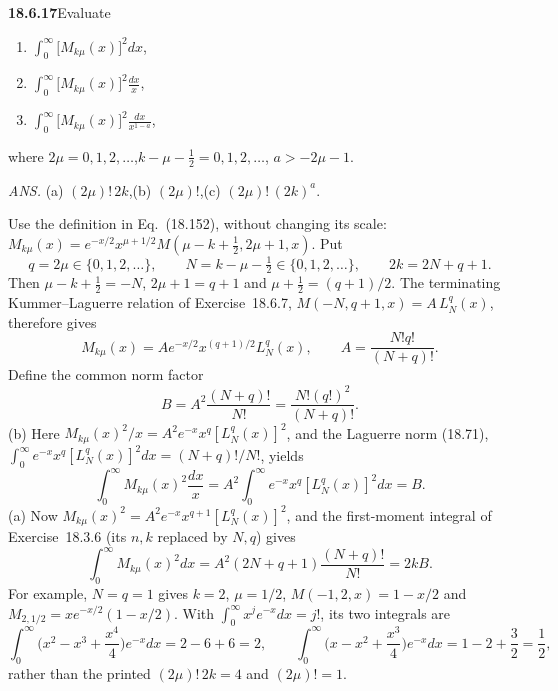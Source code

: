 \par\bigskip
\noindent\textbf{18.6.17}\quad Evaluate
\begin{enumerate}
\item[(a)] $\displaystyle\int_{0}^{\infty}
\big[M_{k\mu}(x)\big]^{2}dx$,
\item[(b)] $\displaystyle\int_{0}^{\infty}
\big[M_{k\mu}(x)\big]^{2}\frac{dx}{x}$,
\item[(c)] $\displaystyle\int_{0}^{\infty}
\big[M_{k\mu}(x)\big]^{2}\frac{dx}{x^{1-a}}$,
\end{enumerate}
where $2\mu=0,1,2,\ldots$,\quad $k-\mu-\tfrac{1}{2}=0,1,2,\ldots$,
\quad $a>-2\mu-1$.
\par\nobreak\hfill\emph{ANS.}\enspace
(a) $(2\mu)!\,2k$,\quad (b) $(2\mu)!$,\quad (c) $(2\mu)!\,(2k)^{a}$.
\par{}\par\nobreak
\solution
Use the definition in Eq.~(18.152), without changing its scale:
$M_{k\mu}(x)=e^{-x/2}x^{\mu+1/2}M(\mu-k+\tfrac12,2\mu+1,x)$.
Put
\[
q=2\mu\in\{0,1,2,\ldots\},\qquad
N=k-\mu-\tfrac12\in\{0,1,2,\ldots\},\qquad
2k=2N+q+1.
\]
Then $\mu-k+\tfrac12=-N$, $2\mu+1=q+1$ and $\mu+\tfrac12=(q+1)/2$.
The terminating Kummer--Laguerre relation of Exercise~18.6.7,
$M(-N,q+1,x)=A\,L_N^q(x)$, therefore gives
\[
M_{k\mu}(x)=A e^{-x/2}x^{(q+1)/2}L_N^q(x),\qquad
 A=\frac{N!q!}{(N+q)!}.
\]
Define the common norm factor
\[
B=A^2\frac{(N+q)!}{N!}
 =\boxed{\frac{N!(q!)^2}{(N+q)!}}.
\]
(b) Here $M_{k\mu}(x)^2/x=A^2e^{-x}x^q[L_N^q(x)]^2$, and the
Laguerre norm (18.71),
$\int_0^\infty e^{-x}x^q[L_N^q(x)]^2dx=(N+q)!/N!$, yields
\[
\int_0^\infty M_{k\mu}(x)^2\frac{dx}x
 =A^2\int_0^\infty e^{-x}x^q[L_N^q(x)]^2dx
 =\boxed{B}.
\]
(a) Now $M_{k\mu}(x)^2=A^2e^{-x}x^{q+1}[L_N^q(x)]^2$, and the
first-moment integral of Exercise~18.3.6 (its $n,k$ replaced by
$N,q$) gives
\[
\int_0^\infty M_{k\mu}(x)^2dx
 =A^2(2N+q+1)\frac{(N+q)!}{N!}
 =\boxed{2kB}.
\]
For example, $N=q=1$ gives $k=2$, $\mu=1/2$, $M(-1,2,x)=1-x/2$ and
$M_{2,1/2}=xe^{-x/2}(1-x/2)$.  With
$\int_0^\infty x^je^{-x}dx=j!$, its two integrals are
\[
\int_0^\infty\Big(x^2-x^3+\frac{x^4}4\Big)e^{-x}dx=2-6+6=2,
\qquad
\int_0^\infty\Big(x-x^2+\frac{x^3}4\Big)e^{-x}dx=1-2+\frac32=\frac12,
\]
rather than the printed $(2\mu)!\,2k=4$ and $(2\mu)!=1$.

